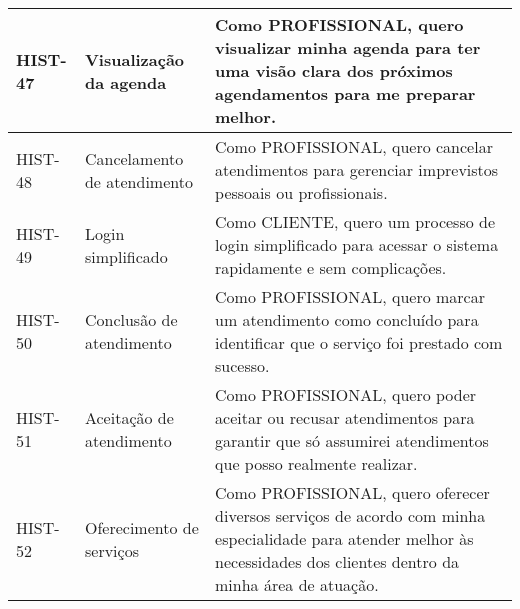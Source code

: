 \begin{longtable}{|p{2cm}|p{4cm}|p{9cm}|}
	HIST-47 & Visualização da agenda & Como PROFISSIONAL, quero visualizar minha agenda para ter uma visão clara dos próximos agendamentos para me preparar melhor. \\ \hline
	HIST-48 & Cancelamento de atendimento & Como PROFISSIONAL, quero cancelar atendimentos para gerenciar imprevistos pessoais ou profissionais. \\ \hline
	HIST-49 & Login simplificado & Como CLIENTE, quero um processo de login simplificado para acessar o sistema rapidamente e sem complicações. \\ \hline
	HIST-50 & Conclusão de atendimento & Como PROFISSIONAL, quero marcar um atendimento como concluído para identificar que o serviço foi prestado com sucesso. \\ \hline
	HIST-51 & Aceitação de atendimento & Como PROFISSIONAL, quero poder aceitar ou recusar atendimentos para garantir que só assumirei atendimentos que posso realmente realizar. \\ \hline
	HIST-52 & Oferecimento de serviços & Como PROFISSIONAL, quero oferecer diversos serviços de acordo com minha especialidade para atender melhor às necessidades dos clientes dentro da minha área de atuação. \\ \hline
\end{longtable}